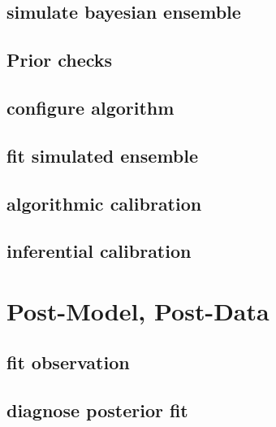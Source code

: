 \documentclass[11pt, oneside]{book}
\begin{document}
\hypertarget{simulate-bayesian-ensemble}{%
\subsection{simulate bayesian ensemble}\label{simulate-bayesian-ensemble}}

\hypertarget{prior-checks}{%
\subsection{Prior checks}\label{prior-checks}}

\hypertarget{configure-algorithm}{%
\subsection{configure algorithm}\label{configure-algorithm}}

\hypertarget{fit-simulated-ensemble}{%
\subsection{fit simulated ensemble}\label{fit-simulated-ensemble}}

\hypertarget{algorithmic-calibration}{%
\subsection{algorithmic calibration}\label{algorithmic-calibration}}

\hypertarget{inferential-calibration}{%
\subsection{inferential calibration}\label{inferential-calibration}}

\hypertarget{post-model-post-data}{%
\section{Post-Model, Post-Data}\label{post-model-post-data}}

\hypertarget{fit-observation}{%
\subsection{fit observation}\label{fit-observation}}

\hypertarget{diagnose-posterior-fit}{%
\subsection{diagnose posterior fit}\label{diagnose-posterior-fit}}
\end{document}
